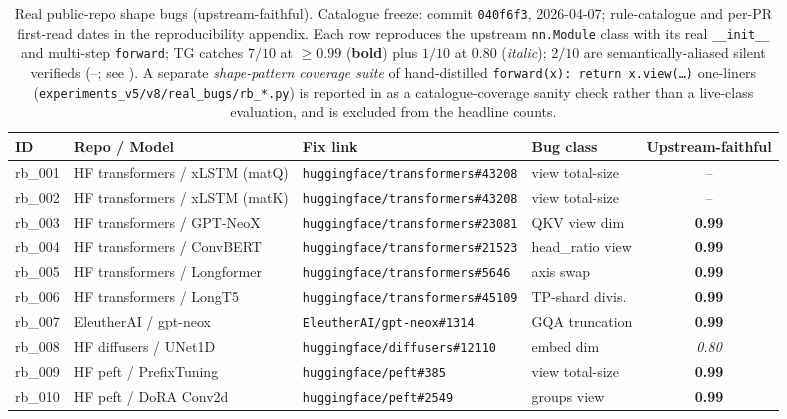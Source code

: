\begin{table}[t]
\centering\small
\setlength{\tabcolsep}{4pt}
\caption{Real public-repo shape bugs (upstream-faithful). Catalogue
freeze: commit \texttt{040f6f3}, 2026-04-07; rule-catalogue and
per-PR first-read dates in the reproducibility appendix.
Each row reproduces the upstream \texttt{nn.Module} class with its
real \texttt{\_\_init\_\_} and multi-step \texttt{forward};
\textsc{TG} catches
$7/10$ at $\ge 0.99$ (\textbf{bold}) plus $1/10$ at $0.80$
(\textit{italic}); $2/10$ are semantically-aliased silent
verifieds (--; see ).
A separate \emph{shape-pattern coverage suite} of hand-distilled
\texttt{forward(x): return x.view(\ldots)} one-liners
(\texttt{experiments\_v5/v8/real\_bugs/rb\_*.py}) is reported in
 as a catalogue-coverage sanity
check rather than a live-class evaluation, and is excluded from
the headline counts.}
\label{tab:real-bugs}
\begin{tabular}{l l l l c}
\toprule
ID & Repo / Model & Fix link & Bug class & Upstream-faithful \\
\midrule
rb\_001 & HF transformers / xLSTM (matQ) & \texttt{huggingface/transformers\#43208} & view total-size & --     \\
rb\_002 & HF transformers / xLSTM (matK) & \texttt{huggingface/transformers\#43208} & view total-size & --     \\
rb\_003 & HF transformers / GPT-NeoX     & \texttt{huggingface/transformers\#23081} & QKV view dim    & \textbf{0.99} \\
rb\_004 & HF transformers / ConvBERT     & \texttt{huggingface/transformers\#21523} & head\_ratio view& \textbf{0.99} \\
rb\_005 & HF transformers / Longformer   & \texttt{huggingface/transformers\#5646}  & axis swap       & \textbf{0.99} \\
rb\_006 & HF transformers / LongT5       & \texttt{huggingface/transformers\#45109} & TP-shard divis. & \textbf{0.99} \\
rb\_007 & EleutherAI / gpt-neox          & \texttt{EleutherAI/gpt-neox\#1314}       & GQA truncation  & \textbf{0.99} \\
rb\_008 & HF diffusers / UNet1D          & \texttt{huggingface/diffusers\#12110}    & embed dim       & \textit{0.80} \\
rb\_009 & HF peft / PrefixTuning         & \texttt{huggingface/peft\#385}           & view total-size & \textbf{0.99} \\
rb\_010 & HF peft / DoRA Conv2d          & \texttt{huggingface/peft\#2549}          & groups view     & \textbf{0.99} \\
\bottomrule
\end{tabular}
\end{table}

